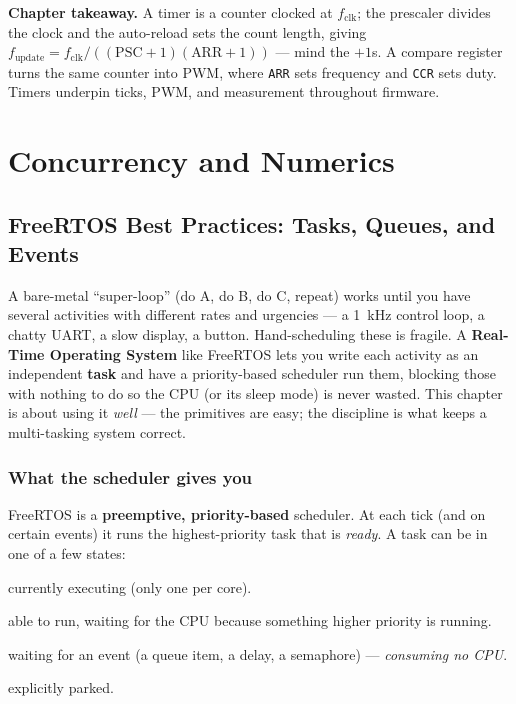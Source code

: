 \documentclass[11pt,a4paper,oneside]{book}
\newcommand{\code}[1]{\texttt{#1}}
\begin{document}
\begin{keyidea}
\textbf{Chapter takeaway.} A timer is a counter clocked at $f_{\text{clk}}$; the
prescaler divides the clock and the auto-reload sets the count length, giving
$f_{\text{update}} = f_{\text{clk}} / ((\text{PSC}{+}1)(\text{ARR}{+}1))$ ---
mind the $+1$s. A compare register turns the same counter into PWM, where
\code{ARR} sets frequency and \code{CCR} sets duty. Timers underpin ticks,
PWM, and measurement throughout firmware.
\end{keyidea}

\part{Concurrency and Numerics}

\chapter{FreeRTOS Best Practices: Tasks, Queues, and Events}
\label{ch:freertos}

A bare-metal ``super-loop'' (do A, do B, do C, repeat) works until you have
several activities with different rates and urgencies --- a \qty{1}{\kilo\hertz}
control loop, a chatty UART, a slow display, a button. Hand-scheduling these is
fragile. A \textbf{Real-Time Operating System} like FreeRTOS lets you write each
activity as an independent \textbf{task} and have a priority-based scheduler run
them, blocking those with nothing to do so the CPU (or its sleep mode) is never
wasted. This chapter is about using it \emph{well} --- the primitives are easy;
the discipline is what keeps a multi-tasking system correct.

\section{What the scheduler gives you}
FreeRTOS is a \textbf{preemptive, priority-based} scheduler. At each tick (and on
certain events) it runs the highest-priority task that is \emph{ready}. A task
can be in one of a few states:
\begin{description}[leftmargin=1.6cm,style=nextline]
  \item[Running] currently executing (only one per core).
  \item[Ready] able to run, waiting for the CPU because something higher
        priority is running.
  \item[Blocked] waiting for an event (a queue item, a delay, a semaphore) ---
        \emph{consuming no CPU}.
  \item[Suspended] explicitly parked.
\end{description}
\end{document}
